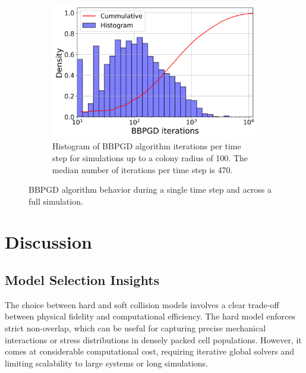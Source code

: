 \documentclass[conference]{IEEEtran}
\begin{document}
\begin{figure}[H]
    \begin{subfigure}[b]{\linewidth}
        \centering
        \includegraphics[width=\linewidth]{figures/comparison_plots/combined_bbpgd_iterations_histogram_cumulative.png}
        \caption{Histogram of BBPGD algorithm iterations per time step for simulations up to a colony radius of 100. The median number of iterations per time step is 470.}
        \label{fig:bbpgd_iterations_histogram}
    \end{subfigure}

    \caption{BBPGD algorithm behavior during a single time step and across a full simulation.}
\end{figure}

\clearpage
\newpage







\newpage
\clearpage

\section{Discussion}

\subsection{Model Selection Insights}

The choice between hard and soft collision models involves a clear trade-off between physical fidelity and computational efficiency.
The hard model enforces strict non-overlap, which can be useful for capturing precise mechanical interactions or stress distributions in densely packed cell populations. However, it comes at considerable computational cost, requiring iterative global solvers and limiting scalability to large systems or long simulations.
\end{document}
